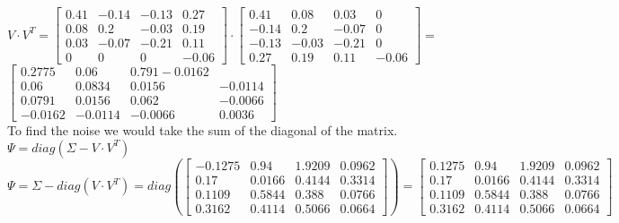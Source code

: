 \documentclass{article}
\begin{document}
    $V\cdot V^T = 
    \begin{bmatrix}
        0.41 & -0.14 & -0.13 & 0.27\\
        0.08 & 0.2 & -0.03 & 0.19 \\
        0.03 & -0.07 & -0.21 & 0.11\\
        0 & 0 & 0 & -0.06
    \end{bmatrix}
    \cdot
    \begin{bmatrix}
        0.41 & 0.08 & 0.03 & 0\\
        -0.14 & 0.2 & -0.07 & 0\\
        -0.13 & -0.03 & -0.21 & 0\\
        0.27 & 0.19 & 0.11 & -0.06
    \end{bmatrix}
    = 
    $
    \\$
    \begin{bmatrix}
        0.2775 & 0.06 & 0.791 -0.0162\\
        0.06 & 0.0834 & 0.0156 & -0.0114\\
        0.0791 & 0.0156 & 0.062 & -0.0066\\
        -0.0162 & -0.0114 & -0.0066 & 0.0036
    \end{bmatrix}
    $ 
    \\To find the noise we would take the sum of the diagonal of the matrix.
    $\Psi = diag(\Sigma - V\cdot V^T)$ 
    \\$\Psi =
    \Sigma - diag(V\cdot V^T) =
    diag(
    \begin{bmatrix}
        -0.1275 & 0.94 & 1.9209 & 0.0962\\
        0.17 & 0.0166 & 0.4144 & 0.3314\\
        0.1109 & 0.5844 & 0.388 & 0.0766\\
        0.3162 & 0.4114 & 0.5066 & 0.0664
    \end{bmatrix}
    )
    =
    \begin{bmatrix}
        0.1275 & 0.94 & 1.9209 & 0.0962\\
        0.17 & 0.0166 & 0.4144 & 0.3314\\
        0.1109 & 0.5844 & 0.388 & 0.0766\\
        0.3162 & 0.4114 & 0.5066 & 0.0664
    \end{bmatrix}
    $
\end{document}
